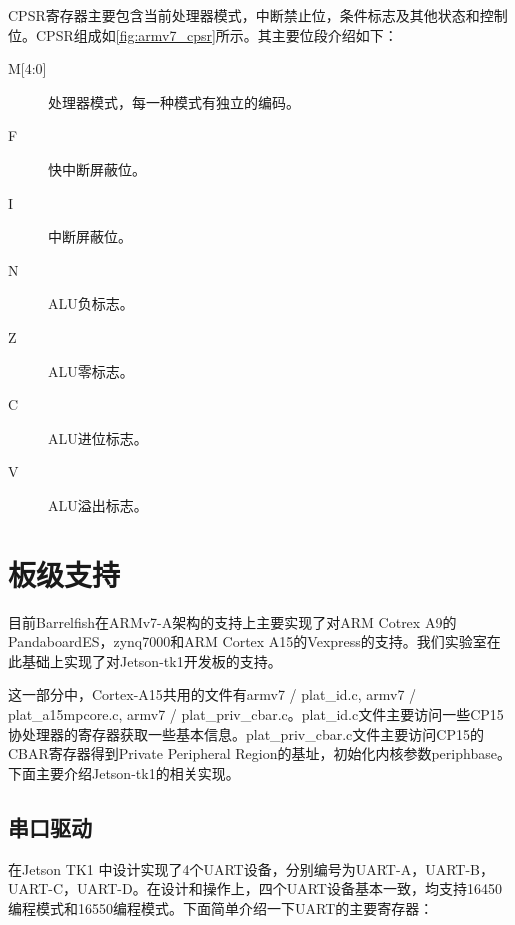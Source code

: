 \documentclass[a4paper, 12pt]{report}
\begin{document}
    CPSR寄存器主要包含当前处理器模式，中断禁止位，条件标志及其他状态和控制位。CPSR组成如\autoref{fig:armv7_cpsr}所示。其主要位段介绍如下：
    
    \begin{description}
        \item[{M[4:0]}] 处理器模式，每一种模式有独立的编码。
        \item[F] 快中断屏蔽位。
        \item[I] 中断屏蔽位。
        \item[N] ALU负标志。
        \item[Z] ALU零标志。
        \item[C] ALU进位标志。
        \item[V] ALU溢出标志。
    \end{description}
    
    \chapter{板级支持}
    
    目前Barrelfish在ARMv7-A架构的支持上主要实现了对ARM Cotrex A9的PandaboardES，zynq7000和ARM Cortex A15的Vexpress的支持。我们实验室在此基础上实现了对Jetson-tk1开发板的支持。
    
    这一部分中，Cortex-A15共用的文件有armv7 / plat\_id.c, armv7 / plat\_a15mpcore.c, armv7 / plat\_priv\_cbar.c。plat\_id.c文件主要访问一些CP15协处理器的寄存器获取一些基本信息。plat\_priv\_cbar.c文件主要访问CP15的CBAR寄存器得到Private Peripheral Region的基址，初始化内核参数periphbase。下面主要介绍Jetson-tk1的相关实现。
    
    \section{串口驱动}
    
    在Jetson TK1 中设计实现了4个UART设备，分别编号为UART-A，UART-B，UART-C，UART-D。在设计和操作上，四个UART设备基本一致，均支持16450编程模式和16550编程模式。下面简单介绍一下UART的主要寄存器：
\end{document}
